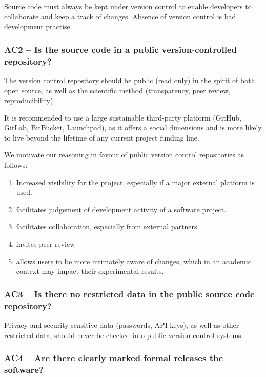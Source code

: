 \documentclass[a4paper,11pt]{article}
\begin{document}
Source code must always be kept under version control to enable developers to
collaborate and keep a track of changes. Absence of version control is bad
development practise. 

\subsubsection{AC2 -- Is the source code in a public version-controlled repository?}

The version control repository should be public (read only) in the spirit of both open
source, as well as the scientific method (transparency, peer review,
reproducibility). 

It is recommended to use a large sustainable third-party platform (GitHub,
GitLab, BitBucket, Launchpad), as it offers a social dimensions and is more
likely to live beyond the lifetime of any current project funding line.

We motivate our reasoning in favour of public version control repositories as follows:

\begin{enumerate}
    \item Increased visibility for the project, especially if a major external platform is used.
    \item facilitates judgement of development activity of a software project.
    \item facilitates collaboration, especially from external partners.
    \item invites peer review
    \item allows users to be more intimately aware of changes, which in an
        academic context may impact their experimental results.
\end{enumerate}

\subsubsection{AC3 -- Is there no restricted data in the public source code repository?}

Privacy and security sensitive data (passwords, API keys), as well as other
restricted data, should never be checked into public version control systems.

\subsubsection{AC4 -- Are there clearly marked formal releases the software?}
\end{document}
